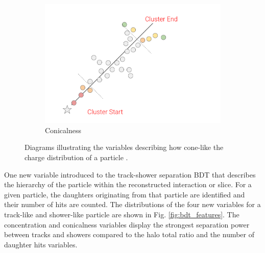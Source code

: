 \begin{figure}[htbp!]
\begin{subfigure}[b]{0.495\textwidth}
            \includegraphics[width=\textwidth]{Conicalness}
            \caption{Conicalness}%
            \label{fig:conicalness}
        \end{subfigure}
        \caption[cone_variables]{
	Diagrams illustrating the variables describing how cone-like the charge distribution of a particle .
	}
        \label{fig:cone_variables}
\end{figure}

One new variable introduced to the track-shower separation BDT that describes the hierarchy of the particle within the reconstructed interaction or slice.
For a given particle, the daughters originating from that particle are identified and their number of hits are counted.
The distributions of the four new variables for a track-like and shower-like particle are shown in Fig. \ref{fig:bdt_features}.
The concentration and conicalness variables display the strongest separation power between tracks and showers compared to the halo total ratio and the number of daughter hits variables.

